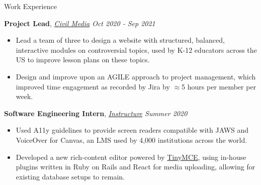 \documentclass{resume}
\begin{document}
\begin{rSection}{Work Experience}
    
    {\bf Project Lead}, {\em \href{https://civilmedia.webflow.io/}{Civil Media} \hfill Oct 2020 - Sep 2021}
    \vspace{-6pt}
    \begin{itemize}[nosep]
        \item Lead a team of three to design a website with structured, balanced, interactive modules on controversial topics, used by K-12 educators across the US to improve lesson plans on these topics.
        \item Design and improve upon an AGILE approach to project management, which improved time engagement as recorded by Jira by $\approx$5 hours per member per week.
    \end{itemize}


    {\bf Software Engineering Intern}, {\em \href{https://www.instructure.com/}{Instructure} \hfill Summer 2020}
    \vspace{-6pt}
    \begin{itemize}[nosep]
        \item Used A11y guidelines to provide screen readers compatible with JAWS and VoiceOver for Canvas, an LMS used by 4,000 institutions across the world.
        \item Developed a new rich-content editor powered by \href{https://www.tiny.cloud/}{TinyMCE}, using in-house plugins written in Ruby on Rails and React for media uploading, allowing for existing database setups to remain.
    \end{itemize}
    

\end{rSection}
\end{document}
